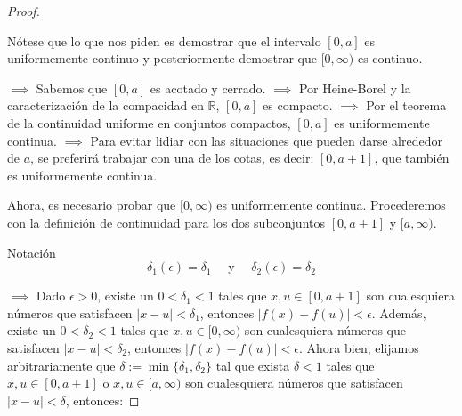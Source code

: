 \begin{proof}
\begin{center}
\end{center}

Nótese que lo que nos piden es demostrar que el intervalo $[0,a]$ es uniformemente continuo y posteriormente demostrar que $[0,\infty)$ es continuo. 

\linita 

$\implies$ Sabemos que $[0,a]$ es acotado y cerrado. $\implies$ Por Heine-Borel y la caracterización de la compacidad en $\mathbb{R}$, $[0,a]$ es compacto. $\implies$ Por el teorema de la continuidad uniforme en conjuntos compactos, $[0,a]$ es uniformemente continua.  $\implies$ Para evitar lidiar con las situaciones que pueden darse alrededor de $a$, se preferirá trabajar con una de los cotas, es decir: $[0,a+1]$, que también es uniformemente continua. 

\linita 

Ahora, es necesario probar que $[0,\infty)$ es uniformemente continua. Procederemos con la definición de continuidad para los dos subconjuntos $[0,a+1]$ y $[a,\infty)$.

\linita 

\begin{noter}{Notación}
$$\delta_1(\epsilon)=\delta_1 \quad \text{ y }\quad  \delta_2(\epsilon)=\delta_2$$
\end{noter}
$\implies$ Dado $\epsilon>0$, existe un $0<\delta_1<1$ tales que $x,u\in [0,a+1]$ son cualesquiera números que satisfacen $|x-u|<\delta_1$, entonces $|f(x)-f(u)|<\epsilon$. Además, existe un $0<\delta_2<1$ tales que $x,u\in[0,\infty)$ son cualesquiera números que satisfacen $|x-u|<\delta_2$, entonces $|f(x)-f(u)|<\epsilon$. Ahora bien, elijamos arbitrariamente que $\delta:= \min\{\delta_1,\delta_2\}$ tal que exista $\delta<1$ tales que $x,u\in[0,a+1]$ o $x,u\in[a,\infty)$ son cualesquiera números que satisfacen $|x-u|<\delta$, entonces: 


\end{proof}
